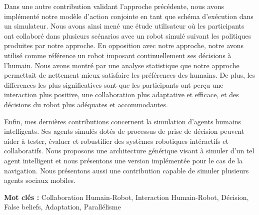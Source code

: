 Dans une autre contribution validant l'approche précédente, nous avons implémenté notre modèle d'action conjointe en tant que schéma d'exécution dans un simulateur. Nous avons ainsi mené une étude utilisateur où les participants ont collaboré dans plusieurs scénarios avec un robot simulé suivant les politiques produites par notre approche. En opposition avec notre approche, notre avons utilisé comme référence un robot imposant continuellement ses décisions à l'humain. Nous avons montré par une analyse statistique que notre approche permettait de nettement mieux satisfaire les préférences des humains. De plus, les differences les plus significatives sont que les participants ont perçu une interaction plus positive, une collaboration plus adaptative et efficace, et des décisions du robot plus adéquates et accommodantes.   

Enfin, mes dernières contributions concernent la simulation d'agents humains intelligents. Ses agents simulés dotés de processus de prise de décision peuvent aider à tester, évaluer et robustifier des systèmes robotiques intéractifs et collaboratifs. Nous proposons une architecture générique visant à simuler d'un tel agent intelligent et nous présentons une version implémentée pour le cas de la navigation. Nous présentons aussi une contribution capable de simuler plusieurs agents sociaux mobiles.

\textbf{Mot clés : } Collaboration Humain-Robot, Interaction Humain-Robot, Décision, False beliefs, Adaptation, Parallélisme
